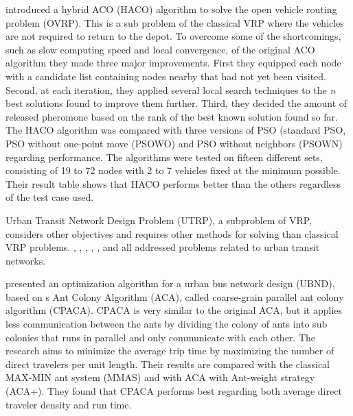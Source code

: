 \citet{sedighpour14} introduced a hybrid ACO (HACO) algorithm to solve the open vehicle routing problem (OVRP). This is a sub problem of the classical VRP where the vehicles are not required to return to the depot. To overcome some of the shortcomings, such as slow computing speed and local convergence, of the original ACO algorithm they made three major improvements. First they equipped each node with a candidate list containing nodes nearby that had not yet been visited. Second, at each iteration, they applied several local search techniques to the \textit{n} best solutions found to improve them further. Third, they decided the amount of released pheromone based on the rank of the best known solution found so far. The HACO algorithm was compared with three versions of PSO (standard PSO, PSO without one-point move (PSOWO) and PSO without neighbors (PSOWN) regarding performance. The algorithms were tested on fifteen different sets, consisting of 19 to 72 nodes with 2 to 7 vehicles fixed at the minimum possible. Their result table shows that HACO performs better than the others regardless of the test case used.\newline

Urban Transit Network Design Problem (UTRP), a subproblem of VRP, considers other objectives and requires other methods for solving than classical VRP problems. \citet{yang07}, \citet{salehinejad10}, \citet{jiang10}, \citet{poorzahedy11}, \citet{nikolic14}, and \citet{kechagiopoulos14} all addressed problems related to urban transit networks. \newline

\citet{yang07} presented an optimization algorithm for a urban bus network design (UBND), based on \citet{dorigo96}s Ant Colony Algorithm (ACA), called coarse-grain parallel ant colony algorithm (CPACA). CPACA is very similar to the original ACA, but it applies less communication between the ants by dividing the colony of ants into sub colonies that runs in parallel and only communicate with each other. The research aims to minimize the average trip time by maximizing the number of direct travelers per unit length. Their results are compared with the classical MAX-MIN ant system (MMAS)\citep{stutzle99} and with ACA with Ant-weight strategy (ACA+). They found that CPACA performs best regarding both average direct traveler density and run time. 

